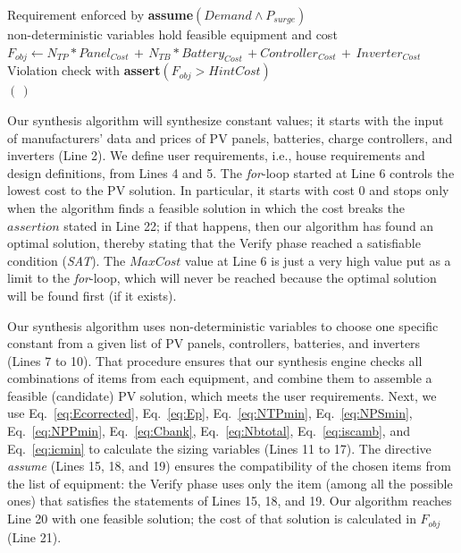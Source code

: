 \documentclass[runningheads]{llncs}
\begin{document}
\begin{algorithm}
\begin{algorithmic}[1]
\begin{scriptsize}
	\STATE Requirement enforced by \textbf{assume}$(Demand \wedge P_{surge})$ \\
	\STATE non-deterministic variables hold feasible equipment and cost \\
	\STATE $F_{obj} \leftarrow N_{TP}*Panel_{Cost} \, + \, N_{TB}*Battery_{Cost} \, + Controller_{Cost} \, + \, Inverter_{Cost}$ \\
	\STATE Violation check with \textbf{assert}$(F_{obj} > HintCost)$ \\
 \ENDFOR
 \RETURN $(\,)$ 
 \end{scriptsize}
 \end{algorithmic} 
 \label{alg:verification-algorithm}
 \end{algorithm}
%
Our synthesis algorithm will synthesize constant values; it starts with the input of manufacturers' data and prices of PV panels, batteries, charge controllers, and inverters (Line 2). We define user requirements, i.e., house requirements and design definitions, from Lines 4 and 5. The \textit{for}-loop started at Line 6 controls the lowest cost to the PV solution. In particular, it starts with cost $0$ and stops only when the algorithm finds a feasible solution in which the cost breaks the $assertion$ stated in Line 22; if that happens, then our algorithm has found an optimal solution, thereby stating that the {\sc Verify} phase reached a satisfiable condition (\textit{SAT}). The $MaxCost$ value at Line 6 is just a very high value put as a limit to the \textit{for}-loop, which will never be reached because the optimal solution will be found first (if it exists).

Our synthesis algorithm uses non-deterministic variables to choose one specific constant from a given list of PV panels, controllers, batteries, and inverters (Lines 7 to 10). That procedure ensures that our synthesis engine checks all combinations of items from each equipment, and combine them to assemble a feasible (candidate) PV solution, which meets the user requirements.
%
Next, we use Eq.~\ref{eq:Ecorrected}, Eq.~\ref{eq:Ep}, Eq.~\ref{eq:NTPmin}, Eq.~\ref{eq:NPSmin}, Eq.~\ref{eq:NPPmin}, Eq.~\ref{eq:Cbank}, Eq.~\ref{eq:Nbtotal}, Eq.~\ref{eq:iscamb}, and Eq.~\ref{eq:icmin} to calculate the sizing variables (Lines 11 to 17). The directive \textit{assume} (Lines 15, 18, and 19) ensures the compatibility of the chosen items from the list of equipment: the {\sc Verify} phase uses only the item (among all the possible ones) that satisfies the statements of Lines 15, 18, and 19. Our algorithm reaches Line 20 with one feasible solution; the cost of that solution is calculated in $F_{obj}$ (Line 21). 
\end{document}

